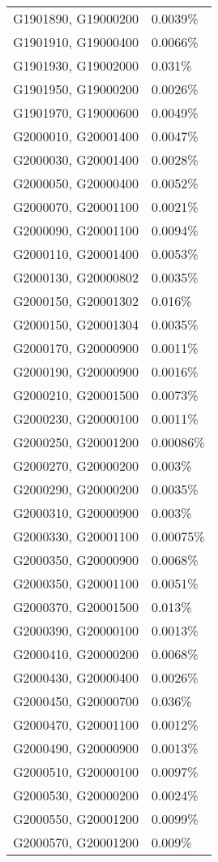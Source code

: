 \begin{longtable}[]{@{}ll@{}}
G1901890, G19000200 & 0.0039\% \\
G1901910, G19000400 & 0.0066\% \\
G1901930, G19002000 & 0.031\% \\
G1901950, G19000200 & 0.0026\% \\
G1901970, G19000600 & 0.0049\% \\
G2000010, G20001400 & 0.0047\% \\
G2000030, G20001400 & 0.0028\% \\
G2000050, G20000400 & 0.0052\% \\
G2000070, G20001100 & 0.0021\% \\
G2000090, G20001100 & 0.0094\% \\
G2000110, G20001400 & 0.0053\% \\
G2000130, G20000802 & 0.0035\% \\
G2000150, G20001302 & 0.016\% \\
G2000150, G20001304 & 0.0035\% \\
G2000170, G20000900 & 0.0011\% \\
G2000190, G20000900 & 0.0016\% \\
G2000210, G20001500 & 0.0073\% \\
G2000230, G20000100 & 0.0011\% \\
G2000250, G20001200 & 0.00086\% \\
G2000270, G20000200 & 0.003\% \\
G2000290, G20000200 & 0.0035\% \\
G2000310, G20000900 & 0.003\% \\
G2000330, G20001100 & 0.00075\% \\
G2000350, G20000900 & 0.0068\% \\
G2000350, G20001100 & 0.0051\% \\
G2000370, G20001500 & 0.013\% \\
G2000390, G20000100 & 0.0013\% \\
G2000410, G20000200 & 0.0068\% \\
G2000430, G20000400 & 0.0026\% \\
G2000450, G20000700 & 0.036\% \\
G2000470, G20001100 & 0.0012\% \\
G2000490, G20000900 & 0.0013\% \\
G2000510, G20000100 & 0.0097\% \\
G2000530, G20000200 & 0.0024\% \\
G2000550, G20001200 & 0.0099\% \\
G2000570, G20001200 & 0.009\% \\

\end{longtable}
